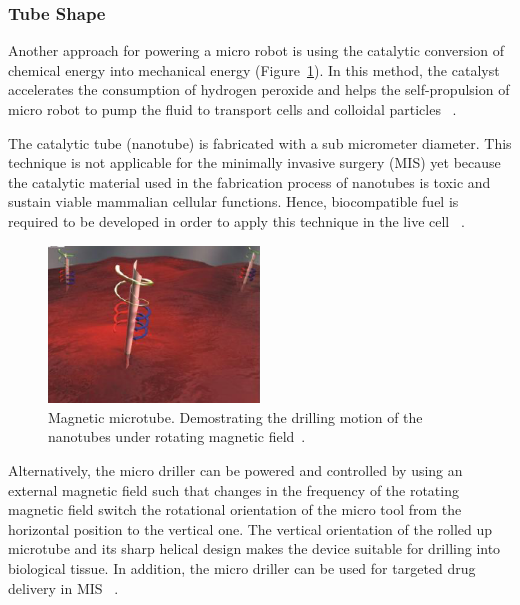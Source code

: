\documentclass[a4paper,11pt]{article}
\begin{document}
\begin{sloppypar}
\paragraph{}
\subsubsection{Tube Shape}


Another approach for powering a micro robot is using the catalytic conversion of chemical energy
 into mechanical energy (Figure~\ref{nanotube}). In this method, the catalyst accelerates the consumption of hydrogen peroxide
 and helps the self-propulsion of micro robot to pump the fluid to transport cells and colloidal 
particles ~\citep{C2NR32798H}.

The catalytic tube (nanotube) is fabricated with a sub micrometer diameter.
 This technique is not applicable for the minimally invasive surgery (MIS) yet because the catalytic
 material used in the fabrication process of nanotubes is toxic and sustain viable mammalian cellular 
functions. Hence, biocompatible fuel is required to be developed in order to apply this technique in the 
live cell ~\citep{C2NR32798H}.


\begin{figure}
  \begin{center}
    \includegraphics[width=0.5\textwidth]{nanoJet3}
  \caption{Magnetic microtube. Demostrating the drilling motion of the nanotubes under rotating
 magnetic field~\citep{C2NR32798H}.}
  \label{nanotube}
\end{center}
\end{figure}
Alternatively, the micro driller can be powered and controlled by using an external magnetic field 
such that changes in the frequency of the rotating magnetic field switch the rotational orientation of the 
micro tool from the horizontal position to the vertical one. The vertical orientation of the rolled up microtube 
and its sharp helical design makes the device suitable for drilling into biological tissue. In addition, the micro 
driller can be used for targeted drug delivery in MIS ~\citep{C2NR32798H}. 





\end{sloppypar}
\end{document}
